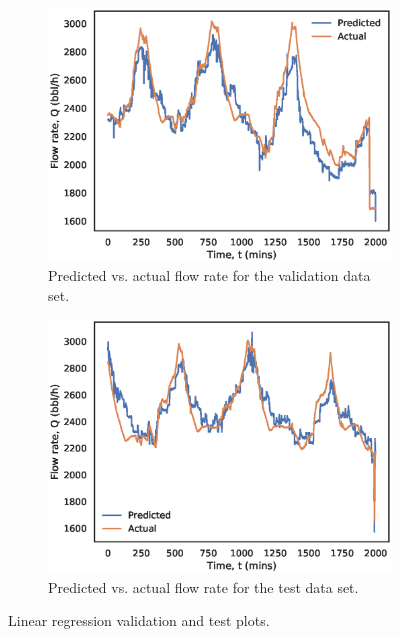\begin{figure}[h]
     \centering
     \begin{subfigure}[b]{0.48\textwidth}
         \centering
         \includegraphics[width=\textwidth]{images/suncor/08ls_validation.eps}
         \caption{Predicted vs. actual flow rate for the validation data set.}
         \label{fig:02LSValidation}
     \end{subfigure}
     \hfill
     \begin{subfigure}[b]{0.48\textwidth}
         \centering
         \includegraphics[width=\textwidth]{images/suncor/08ls_test.eps}
         \caption{Predicted vs. actual flow rate for the test data set.}
         \label{fig:02LSTest}
     \end{subfigure}
     \caption{Linear regression validation and test plots.}
        \label{fig:02LSPlots}
\end{figure}

